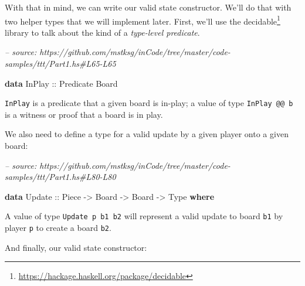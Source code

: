 \documentclass[]{article}
\newenvironment{Shaded}{}{}
\newcommand{\CommentTok}[1]{\textcolor[rgb]{0.38,0.63,0.69}{\textit{#1}}}
\newcommand{\DataTypeTok}[1]{\textcolor[rgb]{0.56,0.13,0.00}{#1}}
\newcommand{\KeywordTok}[1]{\textcolor[rgb]{0.00,0.44,0.13}{\textbf{#1}}}
\newcommand{\OtherTok}[1]{\textcolor[rgb]{0.00,0.44,0.13}{#1}}
\renewcommand{\href}[2]{#2\footnote{\url{#1}}}
\begin{document}
With that in mind, we can write our valid state constructor. We'll do that with
two helper types that we will implement later. First, we'll use the
\href{https://hackage.haskell.org/package/decidable}{decidable} library to talk
about the kind of a \emph{type-level predicate}.

\begin{Shaded}
\begin{Highlighting}[]
\CommentTok{-- source: https://github.com/mstksg/inCode/tree/master/code-samples/ttt/Part1.hs#L65-L65}

\KeywordTok{data} \DataTypeTok{InPlay}\OtherTok{ ::} \DataTypeTok{Predicate} \DataTypeTok{Board}
\end{Highlighting}
\end{Shaded}

\texttt{InPlay} is a predicate that a given board is in-play; a value of type
\texttt{InPlay\ @@\ b} is a witness or proof that a board is in play.

We also need to define a type for a valid update by a given player onto a given
board:

\begin{Shaded}
\begin{Highlighting}[]
\CommentTok{-- source: https://github.com/mstksg/inCode/tree/master/code-samples/ttt/Part1.hs#L80-L80}

\KeywordTok{data} \DataTypeTok{Update}\OtherTok{ ::} \DataTypeTok{Piece} \OtherTok{->} \DataTypeTok{Board} \OtherTok{->} \DataTypeTok{Board} \OtherTok{->} \DataTypeTok{Type} \KeywordTok{where}
\end{Highlighting}
\end{Shaded}

A value of type \texttt{Update\ p\ b1\ b2} will represent a valid update to
board \texttt{b1} by player \texttt{p} to create a board \texttt{b2}.

And finally, our valid state constructor:
\end{document}
